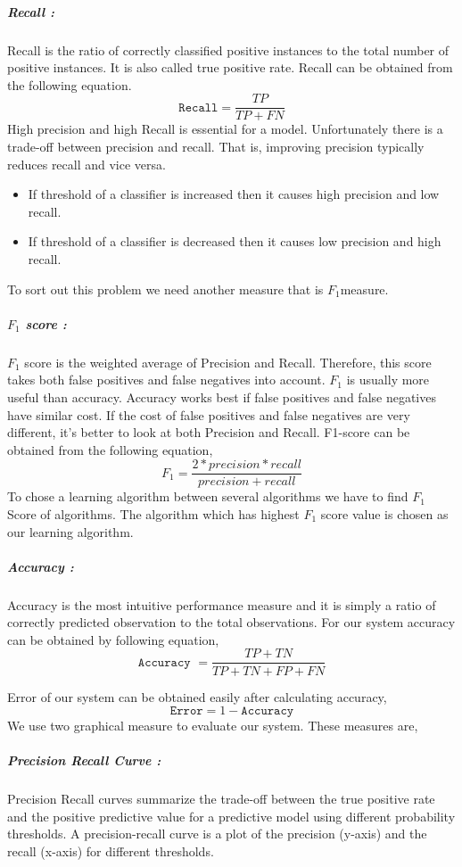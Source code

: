 \subparagraph{Recall :}
Recall is the ratio of correctly classified positive instances to the total number of positive instances. It is also called true positive rate. Recall can be obtained from the following equation.
\begin{equation}
    \texttt{Recall} = \frac{TP}{TP+FN}
\end{equation}
High precision and high Recall is essential for a model. Unfortunately there is a trade-off between precision and recall. That is, improving precision typically reduces recall and vice versa. 
\begin{itemize}
    \item If threshold of a classifier is increased then it causes high precision and low recall.
    \item If threshold of a classifier is decreased then it causes low precision and high recall.
\end{itemize}
To sort out this problem we need another measure that is $F_1$measure.

\subparagraph{$F_1$ score :}
 $F_1$ score is the weighted average of Precision and Recall. Therefore, this score takes both false positives and false negatives into account. $F_1$ is usually more useful than accuracy. Accuracy works best if false positives and false negatives have similar cost. If the cost of false positives and false negatives are very different, it’s better to look at both Precision and Recall. F1-score can be obtained from the following equation,
 \begin{equation}
     F_1 = \frac{2*precision*recall}{precision+recall}
 \end{equation}
To chose a learning algorithm between several algorithms we have to find $F_1$ Score of algorithms. The algorithm which has highest $F_1$ score value is chosen as our learning algorithm.

\subparagraph{Accuracy :}
 Accuracy is the most intuitive performance measure and it is simply a ratio of correctly predicted observation to the total observations. For our system accuracy can be obtained by following equation,
\begin{equation}
    \texttt{Accuracy } = \frac{TP+TN}{TP+TN+FP+FN}
\end{equation}

Error of our system can be obtained easily after calculating accuracy,
\begin{equation}
    \texttt{Error} = 1-\texttt{Accuracy}
\end{equation}
We use two graphical measure to evaluate our system. These measures are,
\subparagraph{Precision Recall Curve :}
Precision Recall curves summarize the trade-off between the true positive rate and the positive predictive value for a predictive model using different probability thresholds. A precision-recall curve is a plot of the precision (y-axis) and the recall (x-axis) for different thresholds. 

